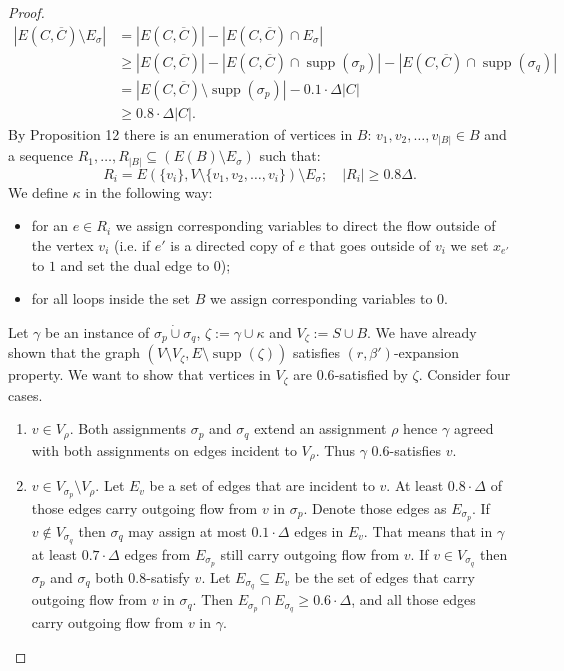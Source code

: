 \documentclass[10pt,a4paper]{article}
\newcommand{\supp}{\operatorname{supp}}
\newcommand{\joint}{\mathbin{\dot\cup}}
\begin{document}
\begin{proof}
\begin{align*}
|E(C,\overline C)\setminus E_\sigma|&=|E(C,\overline C)|-|E(C,\overline C)\cap E_\sigma|\\
&\ge|E(C,\overline C)|-|E(C,\overline C)\cap\supp(\sigma_p)|-|E(C,\overline C)\cap\supp(\sigma_q)|\\
&=|E(C,\overline C)\setminus\supp(\sigma_p)|-0.1\cdot\Delta|C|\\
&\ge0.8\cdot\Delta|C|.
\end{align*}
By Proposition 12 there is an enumeration of vertices in $B$: $v_1,v_2,\ldots,v_{|B|}\in B$ and a sequence $R_1,\ldots,R_{|B|}\subseteq(E(B)\setminus E_\sigma)$ such that:
\[R_i=E(\{v_i\},V\setminus\{v_1,v_2,\ldots,v_i\})\setminus E_\sigma;\quad |R_i|\ge0.8\Delta.\]
We define $\kappa$ in the following way:
\begin{itemize}\item for an $e\in R_i$ we assign corresponding variables to direct the flow outside of the vertex $v_i$ (i.e. if $e'$ is a directed copy of $e$ that goes outside of $v_i$ we set $x_{e'}$ to $1$ and set the dual edge to $0$);
\item for all loops inside the set $B$ we assign corresponding variables to $0$.\end{itemize}
Let $\gamma$ be an instance of $\sigma_p\joint\sigma_q$, $\zeta:=\gamma\cup\kappa$ and $V_\zeta:=S\cup B$. We have already shown that the graph $(V\setminus V_\zeta,E\setminus\supp(\zeta))$ satisfies $(r,\beta')$-expansion property. We want to show that vertices in $V_\zeta$ are $0.6$-satisfied by $\zeta$. Consider four cases.
\begin{enumerate}
\item $v\in V_\rho$. Both assignments $\sigma_p$ and $\sigma_q$ extend an assignment $\rho$ hence $\gamma$ agreed with both assignments on edges incident to $V_\rho$. Thus $\gamma$ $0.6$-satisfies $v$.
\item $v\in V_{\sigma_p}\setminus V_\rho$. Let $E_v$ be a set of edges that are incident to $v$. At least $0.8\cdot\Delta$ of those edges carry outgoing flow from $v$ in $\sigma_p$. Denote those edges as $E_{\sigma_p}$.
If $v\notin V_{\sigma_q}$ then $\sigma_q$ may assign at most $0.1\cdot\Delta$ edges in $E_v$. That means that in $\gamma$ at least $0.7\cdot\Delta$ edges from $E_{\sigma_p}$ still carry outgoing flow from $v$.
If $v\in V_{\sigma_q}$ then $\sigma_p$ and $\sigma_q$ both $0.8$-satisfy $v$. Let $E_{\sigma_q}\subseteq E_v$ be the set of edges that carry outgoing flow from $v$ in $\sigma_q$. Then $E_{\sigma_p}\cap E_{\sigma_q}\ge0.6\cdot\Delta$, and all those edges carry outgoing flow from $v$ in $\gamma$.

\end{enumerate}
\end{proof}
\end{document}
